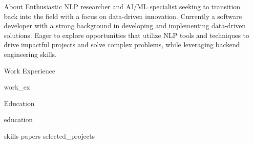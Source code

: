 \documentclass{resume} %
\begin{document}
\begin{rSection}{About}
Enthusiastic NLP researcher and AI/ML specialist seeking to transition back into the field with a focus on data-driven innovation. Currently a software developer with a strong background in developing and implementing data-driven solutions. Eager to explore opportunities that utilize NLP tools and techniques to drive impactful projects and solve complex problems, while leveraging backend engineering skills.
\end{rSection}




\begin{rSection}{\faBriefcase \hspace{0.5mm} Work Experience}

    {work_ex}

\end{rSection}


\begin{rSection}{\faGraduationCap \hspace{0.5mm} Education}

    {education}
    
\end{rSection}


{skills}
{papers}
{selected_projects}


\end{document}
